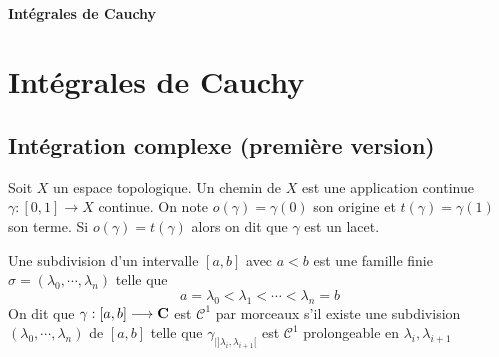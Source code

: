 \ifsolo
    ~

    \vspace{1cm}

    \begin{center}
        \textbf{\LARGE Intégrales de Cauchy} \\[1em]
    \end{center}
    \tableofcontents
\else
    \chapter{Intégrales de Cauchy}

    \minitoc
\fi
\thispagestyle{empty}

\section{Intégration complexe (première version)}

\begin{dfn}
    Soit $X$ un espace topologique. Un chemin de $X$ est une application continue $\gamma:[0,1]\longrightarrow X$ continue. On note $o(\gamma)=\gamma(0)$ son origine et $t(\gamma)=\gamma(1)$ son terme. Si $o(\gamma)=t(\gamma)$ alors on dit que $\gamma$ est un lacet.
\end{dfn}

\begin{dfn}
    Une subdivision d'un intervalle $[a, b]$ avec $a<b$ est une famille finie $\sigma=(\lambda_0, \cdots , \lambda_n)$ telle que \[a=\lambda_0<\lambda_1<\cdots <\lambda_n=b\]
    On dit que $\gamma:[a, b]\longrightarrow \mathbf C$ est $\mathcal C^1$ par morceaux s'il existe une subdivision $(\lambda_0, \cdots , \lambda_n)$ de $[a, b]$ telle que $\gamma_{|]\lambda_i, \lambda_{i+1}[}$ est $\mathcal  C^1$ prolongeable en $\lambda_i, \lambda_{i+1}$
\end{dfn}

